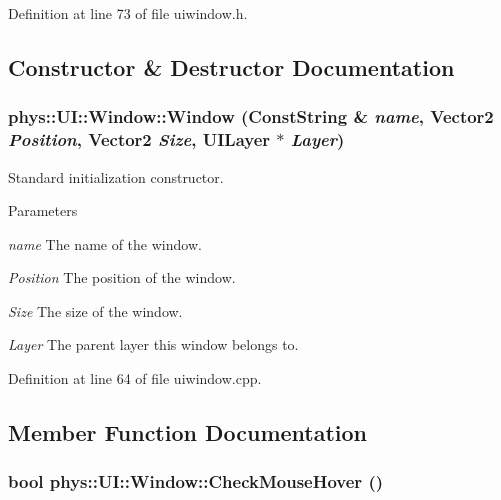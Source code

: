 Definition at line 73 of file uiwindow.h.



\subsection{Constructor \& Destructor Documentation}
\hypertarget{classphys_1_1UI_1_1Window_a81bb894db3fb0dc63e2a5b6f65ecfe4d}{
\subsubsection[{Window}]{\setlength{\rightskip}{0pt plus 5cm}phys::UI::Window::Window ({\bf ConstString} \& {\em name}, \/  {\bf Vector2} {\em Position}, \/  {\bf Vector2} {\em Size}, \/  {\bf UILayer} $\ast$ {\em Layer})}}
\label{d4/d86/classphys_1_1UI_1_1Window_a81bb894db3fb0dc63e2a5b6f65ecfe4d}


Standard initialization constructor. 


\begin{DoxyParams}{Parameters}
\item[{\em name}]The name of the window. \item[{\em Position}]The position of the window. \item[{\em Size}]The size of the window. \item[{\em Layer}]The parent layer this window belongs to. \end{DoxyParams}


Definition at line 64 of file uiwindow.cpp.



\subsection{Member Function Documentation}
\hypertarget{classphys_1_1UI_1_1Window_a771bc9e43c0492ab179d8126c30665cf}{
\subsubsection[{CheckMouseHover}]{\setlength{\rightskip}{0pt plus 5cm}bool phys::UI::Window::CheckMouseHover ()}}
\label{d4/d86/classphys_1_1UI_1_1Window_a771bc9e43c0492ab179d8126c30665cf}


